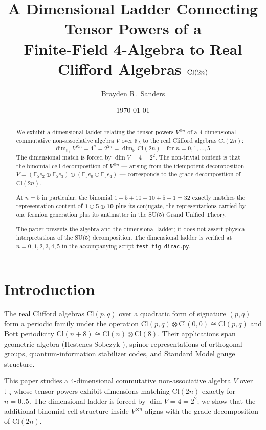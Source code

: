 \documentclass[11pt,reqno]{amsart}
\title[Dimensional Ladder $V^{\otimes n} \leftrightarrow \Cl(2n)$]
{A Dimensional Ladder Connecting Tensor Powers of a \\
 Finite-Field 4-Algebra to Real Clifford Algebras $\Cl(2n)$}
\author{Brayden R.~Sanders}
\date{\today}
\theoremstyle{plain}
\theoremstyle{definition}
\theoremstyle{remark}
\newcommand{\F}{\mathbb{F}}
\newcommand{\R}{\mathbb{R}}
\newcommand{\Cl}{\mathrm{Cl}}
\begin{document}
\begin{abstract}
We exhibit a dimensional ladder relating the tensor powers $V^{\otimes n}$
of a 4-dimensional commutative non-associative algebra $V$ over $\F_5$ to
the real Clifford algebras $\Cl(2n)$:
\[
\dim_{\F_5} V^{\otimes n} = 4^n = 2^{2n} = \dim_\R \Cl(2n)
\quad\text{for } n = 0, 1, \ldots, 5.
\]
The dimensional match is forced by $\dim V = 4 = 2^2$. The non-trivial
content is that the binomial cell decomposition of $V^{\otimes n}$ ---
arising from the idempotent decomposition $V = (\F_5 e_2 \oplus \F_5 e_3)
\oplus (\F_5 e_0 \oplus \F_5 e_4)$ --- corresponds to the grade
decomposition of $\Cl(2n)$.

At $n = 5$ in particular, the binomial $1 + 5 + 10 + 10 + 5 + 1 = 32$
exactly matches the representation content of $\mathbf{1} \oplus
\bar{\mathbf{5}} \oplus \mathbf{10}$ plus its conjugate, the
representations carried by one fermion generation plus its antimatter
in the SU(5) Grand Unified Theory.

The paper presents the algebra and the dimensional ladder; it does not
assert physical interpretations of the SU(5) decomposition. The
dimensional ladder is verified at $n = 0, 1, 2, 3, 4, 5$ in the
accompanying script \texttt{test\_tig\_dirac.py}.
\end{abstract}

\maketitle

\tableofcontents

\section{Introduction}

The real Clifford algebras $\Cl(p, q)$ over a quadratic form of signature
$(p, q)$ form a periodic family under the operation
$\Cl(p, q) \otimes \Cl(0, 0) \cong \Cl(p, q)$
and Bott periodicity $\Cl(n + 8) \cong \Cl(n) \otimes \Cl(8)$.  Their
applications span geometric algebra (Hestenes-Sobczyk
\cite{HesteneSobczyk1984}), spinor representations of orthogonal groups,
quantum-information stabilizer codes, and Standard Model gauge structure.

This paper studies a 4-dimensional commutative non-associative algebra
$V$ over $\F_5$ whose tensor powers exhibit dimensions matching $\Cl(2n)$
exactly for $n=0..5$. The dimensional ladder is forced by $\dim V = 4
= 2^2$; we show that the additional binomial cell structure inside
$V^{\otimes n}$ aligns with the grade decomposition of $\Cl(2n)$.
\end{document}
